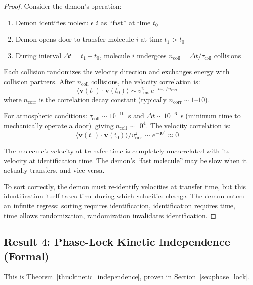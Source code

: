 \begin{proof}
Consider the demon's operation:
\begin{enumerate}
\item Demon identifies molecule $i$ as ``fast'' at time $t_0$
\item Demon opens door to transfer molecule $i$ at time $t_1 > t_0$
\item During interval $\Delta t = t_1 - t_0$, molecule $i$ undergoes $n_{\text{coll}} = \Delta t / \tau_{\text{coll}}$ collisions
\end{enumerate}

Each collision randomizes the velocity direction and exchanges energy with collision partners. After $n_{\text{coll}}$ collisions, the velocity correlation is:
\begin{equation}
\langle \mathbf{v}(t_1) \cdot \mathbf{v}(t_0) \rangle \sim v_{\text{rms}}^2 \, e^{-n_{\text{coll}}/n_{\text{corr}}}
\end{equation}
where $n_{\text{corr}}$ is the correlation decay constant (typically $n_{\text{corr}} \sim 1$--$10$).

For atmospheric conditions: $\tau_{\text{coll}} \sim 10^{-10}$~s and $\Delta t \sim 10^{-6}$~s (minimum time to mechanically operate a door), giving $n_{\text{coll}} \sim 10^4$. The velocity correlation is:
\begin{equation}
\langle \mathbf{v}(t_1) \cdot \mathbf{v}(t_0) \rangle / v_{\text{rms}}^2 \sim e^{-10^4} \approx 0
\end{equation}

The molecule's velocity at transfer time is completely uncorrelated with its velocity at identification time. The demon's ``fast molecule'' may be slow when it actually transfers, and vice versa.

To sort correctly, the demon must re-identify velocities at transfer time, but this identification itself takes time during which velocities change. The demon enters an infinite regress: sorting requires identification, identification requires time, time allows randomization, randomization invalidates identification.
\end{proof}

\subsection{Result 4: Phase-Lock Kinetic Independence (Formal)}

This is Theorem~\ref{thm:kinetic_independence}, proven in Section~\ref{sec:phase_lock}.

